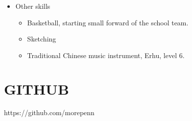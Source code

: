 \documentclass{res}
\begin{document}
\begin{resume}
\begin{itemize}
 
\item Other skills
\begin{itemize}
\item Basketball, starting small forward of the school team.
\item Sketching
\item Traditional Chinese music instrument, Erhu, level 6. 
\end{itemize} 
\end{itemize}
          
 
\section{GITHUB}          
    https://github.com/morepenn         
 
\end{resume}
\end{document}
